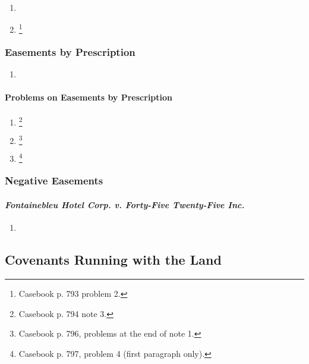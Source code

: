 \begin{enumerate}
    \item %
    \item \footnote{Casebook p. 793 problem 2.}
\end{enumerate}

\subsubsection{Easements by Prescription}

\begin{enumerate}
    \item %
\end{enumerate}

\paragraph{Problems on Easements by Prescription}

\begin{enumerate}
    \item \footnote{Casebook p. 794 note 3.}
    \item \footnote{Casebook p. 796, problems at the end of note 1.}
    \item \footnote{Casebook p. 797, problem 4 (first paragraph only).}
\end{enumerate}

\subsubsection{Negative Easements}


\paragraph{\emph{Fontainebleu Hotel Corp. v. Forty-Five Twenty-Five Inc.}}

\begin{enumerate}
    \item %
\end{enumerate}


\subsection{Covenants Running with the Land}

